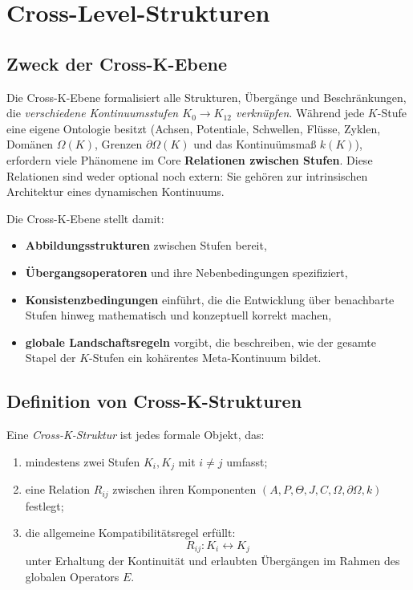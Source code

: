 
\section{Cross-Level-Strukturen}
\label{sec:crossk_master}

\subsection{Zweck der Cross-K-Ebene}
Die Cross-K-Ebene formalisiert alle Strukturen, Übergänge und Beschränkungen, die
\emph{verschiedene Kontinuumsstufen $K_0 \rightarrow K_{12}$ verknüpfen}.
Während jede $K$-Stufe eine eigene Ontologie besitzt (Achsen, Potentiale,
Schwellen, Flüsse, Zyklen, Domänen $\Omega(K)$, Grenzen $\partial\Omega(K)$ und
das Kontinuümsmaß $k(K)$), erfordern viele Phänomene im Core
\textbf{Relationen zwischen Stufen}. Diese Relationen sind weder optional
noch extern: Sie gehören zur intrinsischen Architektur eines dynamischen
Kontinuums.

Die Cross-K-Ebene stellt damit:
\begin{itemize}
  \item \textbf{Abbildungsstrukturen} zwischen Stufen bereit,
  \item \textbf{Übergangsoperatoren} und ihre Nebenbedingungen spezifiziert,
  \item \textbf{Konsistenzbedingungen} einführt, die die Entwicklung
        über benachbarte Stufen hinweg mathematisch und konzeptuell korrekt
        machen,
  \item \textbf{globale Landschaftsregeln} vorgibt, die beschreiben, wie der
        gesamte Stapel der $K$-Stufen ein kohärentes Meta-Kontinuum bildet.
\end{itemize}

\subsection{Definition von Cross-K-Strukturen}
Eine \emph{Cross-K-Struktur} ist jedes formale Objekt, das:
\begin{enumerate}
  \item mindestens zwei Stufen $K_i, K_j$ mit $i \neq j$ umfasst;
  \item eine Relation $R_{ij}$ zwischen ihren Komponenten
        $(A,P,\Theta,J,C,\Omega,\partial\Omega,k)$ festlegt;
  \item die allgemeine Kompatibilitätsregel erfüllt:
        \[
        R_{ij} : K_i \leftrightarrow K_j
        \]
        unter Erhaltung der Kontinuität und erlaubten Übergängen im Rahmen des
        globalen Operators $E$.
\end{enumerate}

